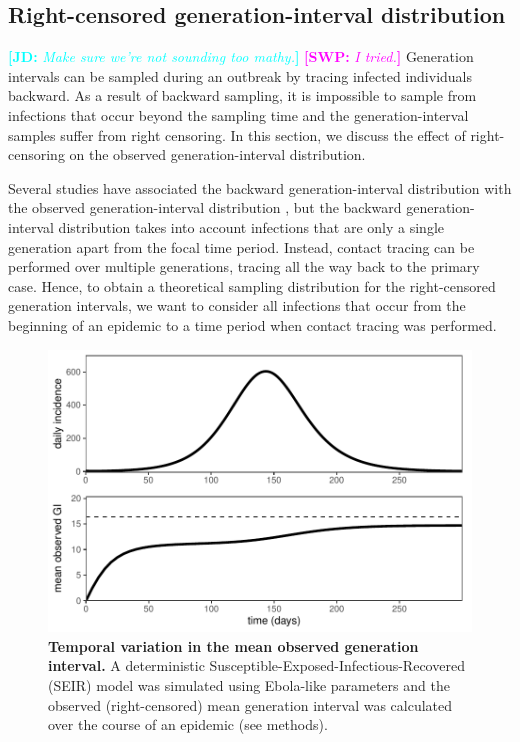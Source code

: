 \documentclass[12pt]{article}
\newcommand{\comment}[3]{\textcolor{#1}{\textbf{[#2: }\textsl{#3}\textbf{]}}}
\newcommand{\jd}[1]{\comment{cyan}{JD}{#1}}
\newcommand{\swp}[1]{\comment{magenta}{SWP}{#1}}
\begin{document}
\subsection{Right-censored generation-interval distribution}

\jd{Make sure we're not sounding too mathy.}
\swp{I tried.}
Generation intervals can be sampled during an outbreak by tracing infected individuals backward.
As a result of backward sampling, it is impossible to sample from infections that occur beyond the sampling time and the generation-interval samples suffer from right censoring.
In this section, we discuss the effect of right-censoring on the observed generation-interval distribution.

Several studies have associated the backward generation-interval distribution with the observed generation-interval distribution \citep{tomba2010some, nishiura2010time, champredon2015intrinsic}, but the backward generation-interval distribution takes into account infections that are only a single generation apart from the focal time period.
Instead, contact tracing can be performed over multiple generations, tracing all the way back to the primary case.
Hence, to obtain a theoretical sampling distribution for the right-censored generation intervals, we want to consider all infections that occur from the beginning of an epidemic to a time period when contact tracing was performed.

\begin{figure}[t]
\includegraphics[width=\textwidth]{../fig/temporal_effect.pdf}
\caption{\textbf{Temporal variation in the mean observed generation interval.}
A deterministic Susceptible-Exposed-Infectious-Recovered (SEIR) model was simulated using Ebola-like parameters and the observed (right-censored) mean generation interval was calculated over the course of an epidemic (see methods).
}
\label{fig:censor}
\end{figure}
\end{document}
